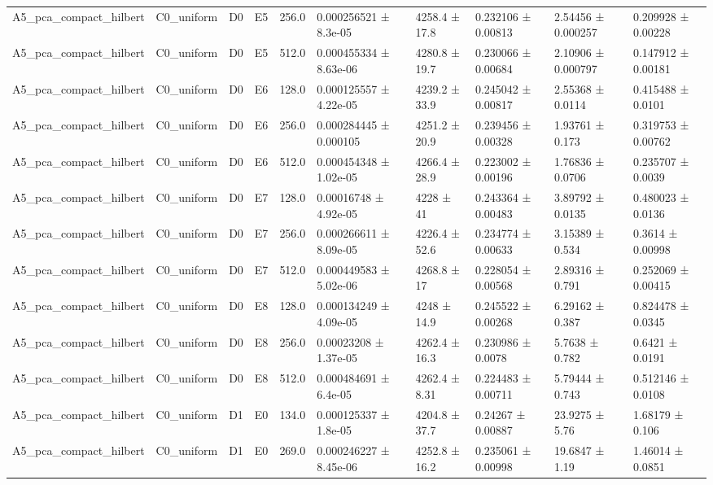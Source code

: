 \begin{table}
\begin{tabular}{llllllllll}
A5\_pca\_compact\_hilbert & C0\_uniform & D0 & E5 & 256.0 & 0.000256521 ± 8.3e-05 & 4258.4 ± 17.8 & 0.232106 ± 0.00813 & 2.54456 ± 0.000257 & 0.209928 ± 0.00228 \\
A5\_pca\_compact\_hilbert & C0\_uniform & D0 & E5 & 512.0 & 0.000455334 ± 8.63e-06 & 4280.8 ± 19.7 & 0.230066 ± 0.00684 & 2.10906 ± 0.000797 & 0.147912 ± 0.00181 \\
A5\_pca\_compact\_hilbert & C0\_uniform & D0 & E6 & 128.0 & 0.000125557 ± 4.22e-05 & 4239.2 ± 33.9 & 0.245042 ± 0.00817 & 2.55368 ± 0.0114 & 0.415488 ± 0.0101 \\
A5\_pca\_compact\_hilbert & C0\_uniform & D0 & E6 & 256.0 & 0.000284445 ± 0.000105 & 4251.2 ± 20.9 & 0.239456 ± 0.00328 & 1.93761 ± 0.173 & 0.319753 ± 0.00762 \\
A5\_pca\_compact\_hilbert & C0\_uniform & D0 & E6 & 512.0 & 0.000454348 ± 1.02e-05 & 4266.4 ± 28.9 & 0.223002 ± 0.00196 & 1.76836 ± 0.0706 & 0.235707 ± 0.0039 \\
A5\_pca\_compact\_hilbert & C0\_uniform & D0 & E7 & 128.0 & 0.00016748 ± 4.92e-05 & 4228 ± 41 & 0.243364 ± 0.00483 & 3.89792 ± 0.0135 & 0.480023 ± 0.0136 \\
A5\_pca\_compact\_hilbert & C0\_uniform & D0 & E7 & 256.0 & 0.000266611 ± 8.09e-05 & 4226.4 ± 52.6 & 0.234774 ± 0.00633 & 3.15389 ± 0.534 & 0.3614 ± 0.00998 \\
A5\_pca\_compact\_hilbert & C0\_uniform & D0 & E7 & 512.0 & 0.000449583 ± 5.02e-06 & 4268.8 ± 17 & 0.228054 ± 0.00568 & 2.89316 ± 0.791 & 0.252069 ± 0.00415 \\
A5\_pca\_compact\_hilbert & C0\_uniform & D0 & E8 & 128.0 & 0.000134249 ± 4.09e-05 & 4248 ± 14.9 & 0.245522 ± 0.00268 & 6.29162 ± 0.387 & 0.824478 ± 0.0345 \\
A5\_pca\_compact\_hilbert & C0\_uniform & D0 & E8 & 256.0 & 0.00023208 ± 1.37e-05 & 4262.4 ± 16.3 & 0.230986 ± 0.0078 & 5.7638 ± 0.782 & 0.6421 ± 0.0191 \\
A5\_pca\_compact\_hilbert & C0\_uniform & D0 & E8 & 512.0 & 0.000484691 ± 6.4e-05 & 4262.4 ± 8.31 & 0.224483 ± 0.00711 & 5.79444 ± 0.743 & 0.512146 ± 0.0108 \\
A5\_pca\_compact\_hilbert & C0\_uniform & D1 & E0 & 134.0 & 0.000125337 ± 1.8e-05 & 4204.8 ± 37.7 & 0.24267 ± 0.00887 & 23.9275 ± 5.76 & 1.68179 ± 0.106 \\
A5\_pca\_compact\_hilbert & C0\_uniform & D1 & E0 & 269.0 & 0.000246227 ± 8.45e-06 & 4252.8 ± 16.2 & 0.235061 ± 0.00998 & 19.6847 ± 1.19 & 1.46014 ± 0.0851 \\

\end{tabular}
\end{table}
